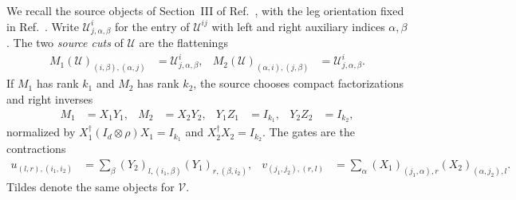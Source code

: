 \documentclass{article}
\begin{document}
We recall the source objects of Section~III of Ref.~\cite{Cirac2017MPU}, with
the leg orientation fixed in Ref.~\cite{gap:mpu_source_cut_orientation}. Write
$\mathcal U^i_{j,\alpha,\beta}$ for the entry of $\mathcal U^{ij}$ with left and
right auxiliary indices $\alpha,\beta$. The two \emph{source cuts} of
$\mathcal U$ are the flattenings
\begin{align}
    M_1(\mathcal U)_{(i,\beta),(\alpha,j)}
     & =\mathcal U^i_{j,\alpha,\beta}, &
    M_2(\mathcal U)_{(\alpha,i),(j,\beta)}
     & =\mathcal U^i_{j,\alpha,\beta}.
    \label{eq:mpu_standard_form_parity_cuts}
\end{align}
If $M_1$ has rank $k_1$ and $M_2$ has rank $k_2$, the source chooses compact
factorizations and right inverses
\begin{align}
    M_1    & =X_1Y_1,  &
    M_2    & =X_2Y_2,  &
    Y_1Z_1 & =I_{k_1}, &
    Y_2Z_2 & =I_{k_2},
    \label{eq:mpu_standard_form_parity_factors}
\end{align}
normalized by $X_1^\dagger(I_d\otimes\rho)X_1=I_{k_1}$ and $X_2^\dagger X_2=I_{k_2}$.
The gates are the contractions
\begin{align}
    u_{(l,r),(i_1,i_2)}
     & =\sum_\beta(Y_2)_{l,(i_1,\beta)}(Y_1)_{r,(\beta,i_2)},    &
    v_{(j_1,j_2),(r,l)}
     & =\sum_\alpha(X_1)_{(j_1,\alpha),r}(X_2)_{(\alpha,j_2),l}.
    \label{eq:mpu_standard_form_parity_gate_formulas}
\end{align}
Tildes denote the same objects for $\mathcal V$.
\end{document}
